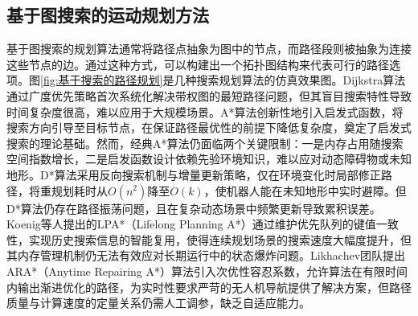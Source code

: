 \documentclass[master,academic]{ysuthesis} %
\begin{document}
		\subsection{基于图搜索的运动规划方法}
		基于图搜索的规划算法通常将路径点抽象为图中的节点，而路径段则被抽象为连接这些节点的边。通过这种方式，可以构建出一个拓扑图结构来代表可行的路径选项。图\ref{fig:基于搜索的路径规划}是几种搜索规划算法的仿真效果图。Dijkstra算法通过广度优先策略首次系统化解决带权图的最短路径问题，但其盲目搜索特性导致时间复杂度很高，难以应用于大规模场景。A*算法创新性地引入启发式函数，将搜索方向引导至目标节点，在保证路径最优性的前提下降低复杂度，奠定了启发式搜索的理论基础。然而，经典A*算法仍面临两个关键限制：一是内存占用随搜索空间指数增长，二是启发函数设计依赖先验环境知识，难以应对动态障碍物或未知地形。D*算法采用反向搜索机制与增量更新策略，仅在环境变化时局部修正路径，将重规划耗时从$O(n^2)$降至$O(k)$，使机器人能在未知地形中实时避障。但D*算法仍存在路径振荡问题，且在复杂动态场景中频繁更新导致累积误差。Koenig等人提出的LPA*（Lifelong Planning A*）通过维护优先队列的键值一致性，实现历史搜索信息的智能复用，使得连续规划场景的搜索速度大幅度提升，但其内存管理机制仍无法有效应对长期运行中的状态爆炸问题。Likhachev团队提出ARA*（Anytime Repairing A*）算法引入次优性容忍系数，允许算法在有限时间内输出渐进优化的路径，为实时性要求严苛的无人机导航提供了解决方案，但路径质量与计算速度的定量关系仍需人工调参，缺乏自适应能力。
\end{document}
